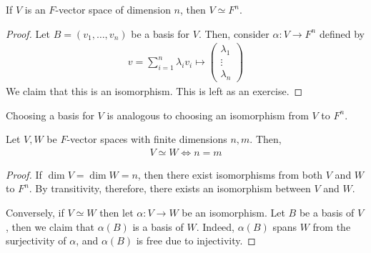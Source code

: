 \begin{theorem}
    If $V$ is an $F$-vector space of dimension $n$, then $V \simeq F^n$.
\end{theorem}
\begin{proof}
    Let $B = (v_1, \dots, v_n)$ be a basis for $V$.
    Then, consider $\alpha \colon V \to F^n$ defined by
    \begin{align*}
        v = \sum_{i=1}^n \lambda_i v_i \mapsto \begin{pmatrix}\lambda_1 \\ \vdots \\ \lambda_n \end{pmatrix}
    \end{align*}
    We claim that this is an isomorphism.
    This is left as an exercise.
\end{proof}
\begin{remark}
    Choosing a basis for $V$ is analogous to choosing an isomorphism from $V$ to $F^n$.
\end{remark}
\begin{theorem}
    Let $V, W$ be $F$-vector spaces with finite dimensions $n, m$.
    Then,
    \begin{align*}
        V \simeq W \iff n = m
    \end{align*}
\end{theorem}
\begin{proof}
    If $\dim V = \dim W = n$, then there exist isomorphisms from both $V$ and $W$ to $F^n$.
    By transitivity, therefore, there exists an isomorphism between $V$ and $W$.

    Conversely, if $V \simeq W$ then let $\alpha \colon V \to W$ be an isomorphism.
    Let $B$ be a basis of $V$, then we claim that $\alpha(B)$ is a basis of $W$.
    Indeed, $\alpha(B)$ spans $W$ from the surjectivity of $\alpha$, and $\alpha(B)$ is free due to injectivity.
\end{proof}

